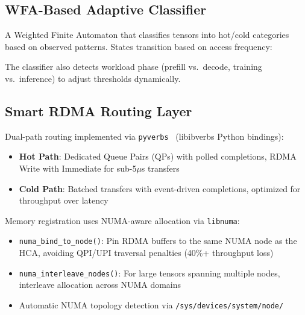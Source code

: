\documentclass[10pt,letterpaper]{article}
\begin{document}
\subsection{WFA-Based Adaptive Classifier}
A Weighted Finite Automaton that classifies tensors into hot/cold categories based on observed patterns. States transition based on access frequency:

\begin{center}
\end{center}

The classifier also detects workload phase (prefill vs.\ decode, training vs.\ inference) to adjust thresholds dynamically.

\subsection{Smart RDMA Routing Layer}
Dual-path routing implemented via \texttt{pyverbs}~\cite{rdma-core} (libibverbs Python bindings):

\begin{itemize}[noitemsep]
    \item \textbf{Hot Path}: Dedicated Queue Pairs (QPs) with polled completions, RDMA Write with Immediate for sub-5$\mu$s transfers
    \item \textbf{Cold Path}: Batched transfers with event-driven completions, optimized for throughput over latency
\end{itemize}

Memory registration uses NUMA-aware allocation via \texttt{libnuma}:
\begin{itemize}[noitemsep]
    \item \texttt{numa\_bind\_to\_node()}: Pin RDMA buffers to the same NUMA node as the HCA, avoiding QPI/UPI traversal penalties (40\%+ throughput loss)
    \item \texttt{numa\_interleave\_nodes()}: For large tensors spanning multiple nodes, interleave allocation across NUMA domains
    \item Automatic NUMA topology detection via \texttt{/sys/devices/system/node/}
\end{itemize}
\end{document}
